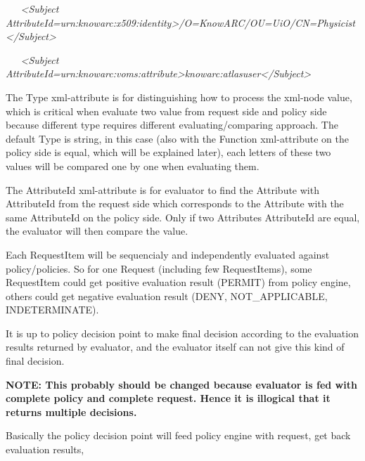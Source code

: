 \documentclass{article}
\begin{document}
{\itshape\color{black}
\ \ \ {\textless}Subject
AttributeId={\textquotedbl}urn:knowarc:x509:identity{\textquotedbl}{\textgreater}/O=KnowARC/OU=UiO/CN=Physicist{\textless}/Subject{\textgreater}}

{\itshape\color{black}
\ \ \ {\textless}Subject
AttributeId={\textquotedbl}urn:knowarc:voms:attribute{\textgreater}knowarc:atlasuser{\textless}/Subject{\textgreater}}

{\color{black}
The {\textquotedbl}Type{\textquotedbl} xml-attribute is for
distinguishing how to process the xml-node value, which is critical
when evaluate two value from request side and policy side because
different type requires different evaluating/comparing approach. The
default {\textquotedbl}Type{\textquotedbl} is
{\textquotedbl}string{\textquotedbl}, in this case (also with the
{\textquotedbl}Function{\textquotedbl} xml-attribute on the policy side
is {\textquotedbl}equal{\textquotedbl}, which will be explained later),
each letters of these two values will be compared one by one when
evaluating them.}

{\color{black}
The {\textquotedbl}AttributeId{\textquotedbl} xml-attribute is for
evaluator to find the Attribute with AttributeId from the request side
which corresponds to the Attribute with the same AttributeId on the
policy side. Only if two Attributes{\textquotesingle} AttributeId are
equal, the evaluator will then compare the value.}

{\color{black}
Each RequestItem will be sequencialy and independently evaluated against
policy/policies. So for one Request (including few RequestItems), some
RequestItem could get positive evaluation result (PERMIT) from policy
engine, others could get negative evaluation result (DENY,
NOT\_APPLICABLE, INDETERMINATE).}

{\color{black}
It is up to policy decision point to make final decision according to
the evaluation results returned by evaluator, and the evaluator itself
can not give this kind of final decision.}

{\bfseries\color{black}
NOTE: This probably should be changed because evaluator is fed with
complete policy and complete request. Hence it is illogical that it
returns multiple decisions.}

{\color{black}
Basically the policy decision point will feed policy engine with
request, get back evaluation results, }
\end{document}

